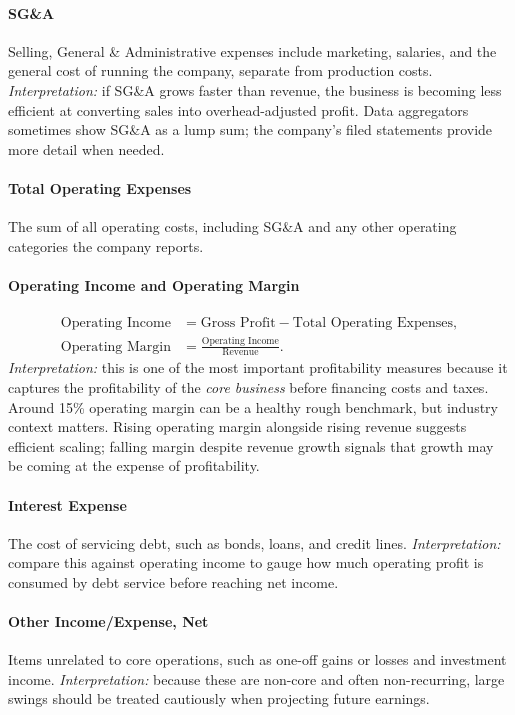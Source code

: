 \documentclass[12pt,openany]{book}
\begin{document}
\paragraph{SG\&A} Selling, General \& Administrative expenses include marketing, salaries, and the general cost of running the company, separate from production costs. \emph{Interpretation:} if SG\&A grows faster than revenue, the business is becoming less efficient at converting sales into overhead-adjusted profit. Data aggregators sometimes show SG\&A as a lump sum; the company's filed statements provide more detail when needed.

\paragraph{Total Operating Expenses} The sum of all operating costs, including SG\&A and any other operating categories the company reports.

\paragraph{Operating Income and Operating Margin}
\begin{align*}
    \text{Operating Income} &= \text{Gross Profit} - \text{Total Operating Expenses}, \\
    \text{Operating Margin} &= \frac{\text{Operating Income}}{\text{Revenue}}.
\end{align*}
\emph{Interpretation:} this is one of the most important profitability measures because it captures the profitability of the \emph{core business} before financing costs and taxes. Around 15\% operating margin can be a healthy rough benchmark, but industry context matters. Rising operating margin alongside rising revenue suggests efficient scaling; falling margin despite revenue growth signals that growth may be coming at the expense of profitability.

\paragraph{Interest Expense} The cost of servicing debt, such as bonds, loans, and credit lines. \emph{Interpretation:} compare this against operating income to gauge how much operating profit is consumed by debt service before reaching net income.

\paragraph{Other Income/Expense, Net} Items unrelated to core operations, such as one-off gains or losses and investment income. \emph{Interpretation:} because these are non-core and often non-recurring, large swings should be treated cautiously when projecting future earnings.
\end{document}
